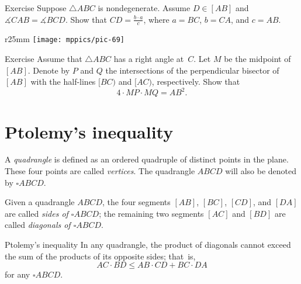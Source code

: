 \begin{thm}{Exercise}\label{ex:ABC+D}
Suppose $\triangle ABC$ is nondegenerate.
Assume $D\in [AB]$ and $\measuredangle CAB=\measuredangle BCD$.
Show that $CD=\tfrac{b\cdot a}c$, where $a=BC$, $b=CA$, and $c=AB$. 
\end{thm}

{

\begin{wrapfigure}{r}{25mm}
\vskip-4mm
\centering
\texttt{[image: mppics/pic-69]}
\end{wrapfigure}

\begin{thm}{Exercise}\label{ex:right-perp-bi}
Assume that $\triangle ABC$ has a right angle at~$C$.
Let $M$ be the midpoint of $[AB]$.
Denote by $P$ and $Q$ the intersections of the perpendicular bisector of $[AB]$ with the half-lines
$[BC)$ and $[AC)$, respectively.
Show that
\[
4\cdot MP\cdot MQ = AB^2.
\]

\end{thm}


}



\section{Ptolemy's inequality}

A \emph{quadrangle} is defined as an ordered quadruple of distinct points in the plane.
These four points are called \emph{vertices}.
The quadrangle $ABCD$ will also be denoted by $\square ABCD$.

Given a quadrangle $ABCD$,
the four segments $[AB]$, $[BC]$, $[CD]$, and $[DA]$ are called \emph{sides of $\square ABCD$};
the remaining two segments $[AC]$ and $[BD]$ are called \emph{diagonals of $\square ABCD$}.

\begin{thm}{Ptolemy's inequality}\label{ptolemy-inq}
In any quadrangle, the product of diagonals cannot exceed the sum of the products of its opposite sides;
that~is, 
\[AC\cdot BD\le AB\cdot CD+ BC\cdot DA\]
for any $\square ABCD$.
\end{thm}

